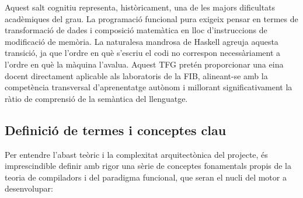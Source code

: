 Aquest salt cognitiu representa, històricament, una de les majors dificultats acadèmiques del grau. La programació funcional pura exigeix pensar en termes de transformació de dades i composició matemàtica en lloc d'instruccions de modificació de memòria. La naturalesa mandrosa de Haskell agreuja aquesta transició, ja que l'ordre en què s'escriu el codi no correspon necessàriament a l'ordre en què la màquina l'avalua. Aquest TFG pretén proporcionar una eina docent directament aplicable als laboratoris de la FIB, alineant-se amb la competència transversal d'aprenentatge autònom i millorant significativament la ràtio de comprensió de la semàntica del llenguatge.

\subsection{Definició de termes i conceptes clau}
Per entendre l'abast teòric i la complexitat arquitectònica del projecte, és imprescindible definir amb rigor una sèrie de conceptes fonamentals propis de la teoria de compiladors i del paradigma funcional, que seran el nucli del motor a desenvolupar:

